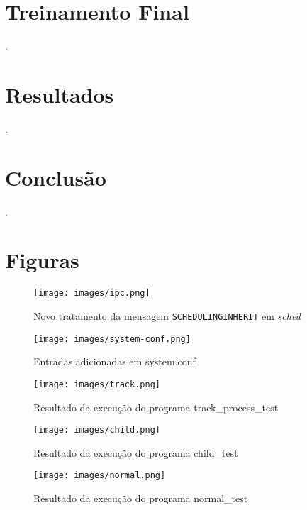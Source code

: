 \documentclass[journal]{IEEEtran}
\begin{document}
\section{Treinamento Final}
\label{sec:treinamento_final}
\lipsum[1].

\section{Resultados}
\label{sec:resultados}
\lipsum[1].

\section{Conclusão}
\label{sec:conclusao}
\lipsum[1].

\clearpage

\appendices
\section{Figuras}

\begin{figure}[H]
    \centering
    \texttt{[image: images/ipc.png]}
    \caption{Novo tratamento da mensagem \texttt{SCHEDULING\textunderscore INHERIT} em \textit{sched}}
    \label{fig:ipc}
\end{figure}

\begin{figure}[H]
    \centering
    \texttt{[image: images/system-conf.png]}
    \caption{Entradas adicionadas em system.conf}
    \label{fig:systemconf}
\end{figure}

\begin{figure}[H]
    \centering
    \texttt{[image: images/track.png]}
    \caption{Resultado da execução do programa track\_process\_test}
    \label{fig:track}
\end{figure}

\begin{figure}[H]
    \centering
    \texttt{[image: images/child.png]}
    \caption{Resultado da execução do programa child\_test}
    \label{fig:child}
\end{figure}

\begin{figure}[H]
    \centering
    \texttt{[image: images/normal.png]}
    \caption{Resultado da execução do programa normal\_test}
    \label{fig:normal}
\end{figure}
\end{document}
